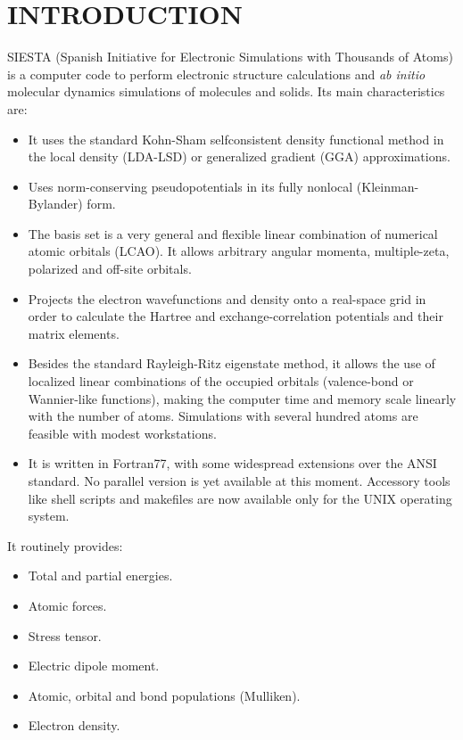 
\tableofcontents

\newpage



\section{INTRODUCTION}

SIESTA (Spanish Initiative for Electronic Simulations with
Thousands of Atoms) is a computer code to perform electronic
structure calculations and {\it ab initio} molecular dynamics
simulations of molecules and solids.
Its main characteristics are:
\begin{itemize}
\item
It uses the standard Kohn-Sham selfconsistent density functional
method in the local density (LDA-LSD) or generalized gradient (GGA)
approximations.
\item
Uses norm-conserving pseudopotentials in its fully nonlocal
(Kleinman-Bylander) form.
\item
The basis set is a very general and flexible linear combination of 
numerical atomic orbitals (LCAO). It allows arbitrary angular
momenta, multiple-zeta, polarized and off-site orbitals.
\item
Projects the electron wavefunctions and density onto a real-space
grid in order to calculate the Hartree and exchange-correlation
potentials and their matrix elements.
\item
Besides the standard Rayleigh-Ritz eigenstate method, it allows
the use of localized linear combinations of the occupied orbitals
(valence-bond or Wannier-like functions), making the computer
time and memory scale linearly with the number of atoms.
Simulations with several hundred atoms are feasible with
modest workstations.
\item
It is written in Fortran77, with some widespread extensions over
the ANSI standard. No parallel version is yet available at this
moment. Accessory tools like shell scripts and makefiles are now
available only for the UNIX operating system.
\end{itemize}

It routinely provides:
\begin{itemize}
\item Total and partial energies.
\item Atomic forces.
\item Stress tensor.
\item Electric dipole moment.
\item Atomic, orbital and bond populations (Mulliken).
\item Electron density.
\end{itemize}

